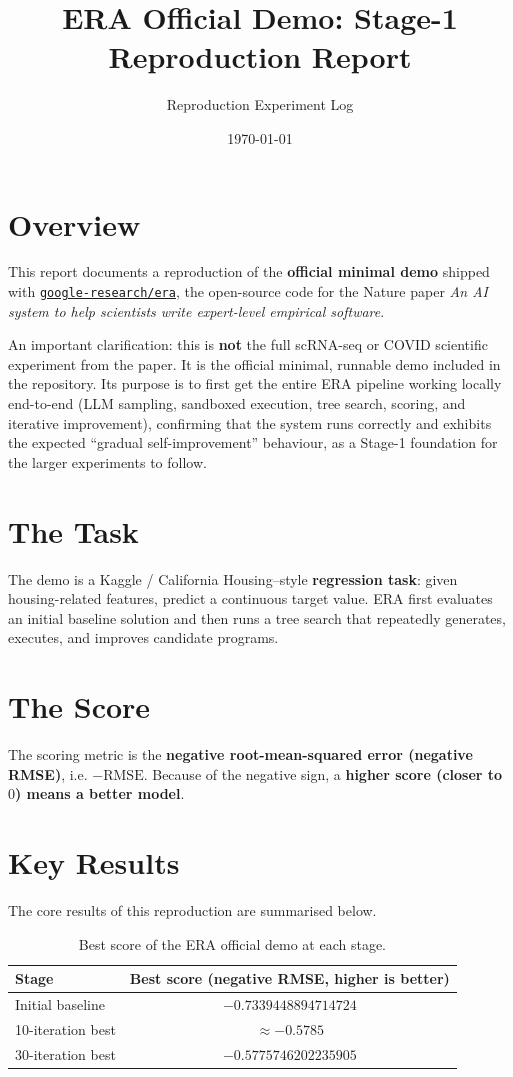 \documentclass[11pt]{article}
\title{ERA Official Demo: Stage-1 Reproduction Report}
\author{Reproduction Experiment Log}
\date{\today}
\begin{document}
\maketitle

\section{Overview}
This report documents a reproduction of the \textbf{official minimal demo} shipped
with \href{https://github.com/google-research/era}{\texttt{google-research/era}},
the open-source code for the Nature paper \emph{An AI system to help scientists
write expert-level empirical software}.

An important clarification: this is \textbf{not} the full scRNA-seq or COVID
scientific experiment from the paper. It is the official minimal, runnable demo
included in the repository. Its purpose is to first get the entire ERA pipeline
working locally end-to-end (LLM sampling, sandboxed execution, tree search,
scoring, and iterative improvement), confirming that the system runs correctly
and exhibits the expected ``gradual self-improvement'' behaviour, as a Stage-1
foundation for the larger experiments to follow.

\section{The Task}
The demo is a Kaggle / California Housing--style \textbf{regression task}: given
housing-related features, predict a continuous target value. ERA first evaluates
an initial baseline solution and then runs a tree search that repeatedly
generates, executes, and improves candidate programs.

\section{The Score}
The scoring metric is the \textbf{negative root-mean-squared error
(negative RMSE)}, i.e. $-\mathrm{RMSE}$. Because of the negative sign, a
\textbf{higher score (closer to $0$) means a better model}.

\section{Key Results}
The core results of this reproduction are summarised below.

\begin{table}[h]
\centering
\begin{tabular}{lc}
\toprule
\textbf{Stage} & \textbf{Best score (negative RMSE, higher is better)} \\
\midrule
Initial baseline        & $-0.7339448894714724$ \\
10-iteration best       & $\approx -0.5785$ \\
30-iteration best       & $-0.5775746202235905$ \\
\bottomrule
\end{tabular}
\caption{Best score of the ERA official demo at each stage.}
\end{table}
\end{document}
